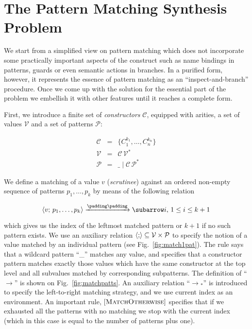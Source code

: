 \section{The Pattern Matching Synthesis Problem}

We start from a simplified view on pattern matching which does not incorporate some practically important aspects of the construct such as
name bindings in patterns, guards or even semantic actions in branches. In a purified form, however, it  represents the essence of pattern
matching as an ``inspect-and-branch'' procedure. Once we come up with the solution for the essential part of the problem we embellish it with
other features until it reaches a complete form.

First, we introduce a finite set of \emph{constructors} $\mathcal C$, equipped with arities, a set of values $\mathcal{V}$
and a set of patterns $\mathcal{P}$:
 
\[
 \begin{array}{rcll}
    \mathcal{C} & = & \{ C_1^{k_1}, \dots, C_n^{k_n} \}\\
    \mathcal{V} & = & \mathcal{C}\,\mathcal{V}^*\\  
    \mathcal{P} & = & \_ \mid \mathcal{C}\,\mathcal{P}^*
 \end{array}
\]

We define a matching of a value $v$ (\emph{scrutinee}) against an ordered non-empty sequence of patterns $p_1,\dots,p_k$ by means of the following
relation

\[
\setarrow{\xrightarrow}
\trans{\inbr{v;\,p_1,\dots,p_k}}{}{i},\,1\le i\le k+1
\]

which gives us the index of the leftmost matched pattern or $k+1$ if no such pattern exists. We use an auxiliary relation $\left<{;}\right>\subseteq\mathcal{V}\times\mathcal{P}$
to specify the notion of a value matched by an individual pattern (see Fig.~\ref{fig:match1pat}). The rule  says that
a wildcard pattern ``\_'' matches any value, and  specifies that a constructor pattern matches exactly those values which
have the same constructor at the top level and all subvalues matched by corresponding subpatterns. The definition of ``$\xrightarrow{}{\!\!}$'' is
shown on Fig.~\ref{fig:matchpatts}. An auxiliary relation
 ``$\xrightarrow{}{}_{\!\!*}$'' 
is introduced to specify the left-to-right matching strategy, and we
use current index as an environment. An important rule, $\mbox{[\textsc{MatchOtherwise}]}$ specifies that if we exhausted all the patterns with no matching we stop with
the current index (which in this case is equal to the number of patterns plus one).

